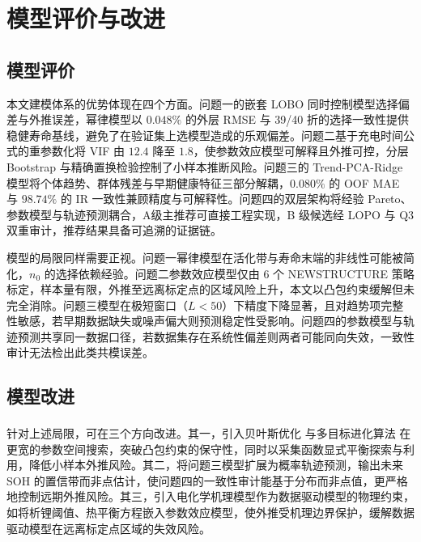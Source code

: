\documentclass[12pt,a4paper]{article}
\newcommand{\supercite}[1]{\textsuperscript{\cite{#1}}}
\begin{document}
\section{模型评价与改进}

\subsection{模型评价}

本文建模体系的优势体现在四个方面。问题一的嵌套 LOBO 同时控制模型选择偏差与外推误差，幂律模型以 $0.048\%$ 的外层 RMSE 与 39/40 折的选择一致性提供稳健寿命基线，避免了在验证集上选模型造成的乐观偏差。问题二基于充电时间公式的重参数化将 VIF 由 $12.4$ 降至 $1.8$，使参数效应模型可解释且外推可控，分层 Bootstrap 与精确置换检验控制了小样本推断风险。问题三的 Trend-PCA-Ridge 模型将个体趋势、群体残差与早期健康特征三部分解耦，$0.080\%$ 的 OOF MAE 与 $98.74\%$ 的 IR 一致性兼顾精度与可解释性。问题四的双层架构将经验 Pareto、参数模型与轨迹预测耦合，A级主推荐可直接工程实现，B 级候选经 LOPO 与 Q3 双重审计，推荐结果具备可追溯的证据链。

模型的局限同样需要正视。问题一幂律模型在活化带与寿命末端的非线性可能被简化，$n_0$ 的选择依赖经验。问题二参数效应模型仅由 6 个 NEWSTRUCTURE 策略标定，样本量有限，外推至远离标定点的区域风险上升，本文以凸包约束缓解但未完全消除。问题三模型在极短窗口（$L<50$）下精度下降显著，且对趋势项完整性敏感，若早期数据缺失或噪声偏大则预测稳定性受影响。问题四的参数模型与轨迹预测共享同一数据口径，若数据集存在系统性偏差则两者可能同向失效，一致性审计无法检出此类共模误差。

\subsection{模型改进}

针对上述局限，可在三个方向改进。其一，引入贝叶斯优化\supercite{ref16} 与多目标进化算法\supercite{ref17} 在更宽的参数空间搜索，突破凸包约束的保守性，同时以采集函数显式平衡探索与利用，降低小样本外推风险。其二，将问题三模型扩展为概率轨迹预测，输出未来 SOH 的置信带而非点估计，使问题四的一致性审计能基于分布而非点值，更严格地控制远期外推风险。其三，引入电化学机理模型作为数据驱动模型的物理约束，如将析锂阈值、热平衡方程嵌入参数效应模型，使外推受机理边界保护，缓解数据驱动模型在远离标定点区域的失效风险。
\end{document}
